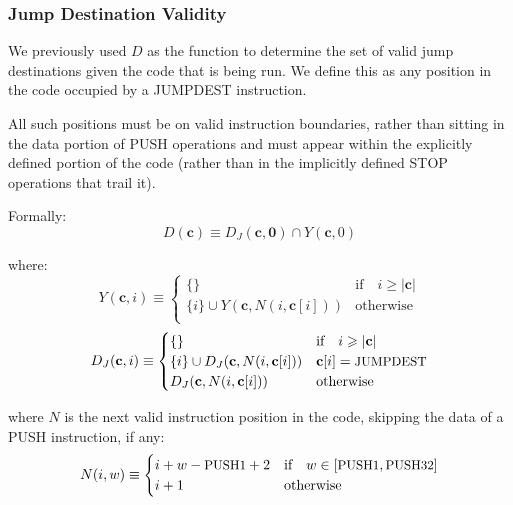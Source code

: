 \documentclass[9pt,oneside]{amsart}
\begin{document}
\begin{multicols}{2}
\subsubsection{Jump Destination Validity}

We previously used $D$ as the function to determine the set of valid jump destinations given the code that is being run. We define this as any position in the code occupied by a {\small JUMPDEST} instruction.

All such positions must be on valid instruction boundaries, rather than sitting in the data portion of {\small PUSH} operations and must appear within the explicitly defined portion of the code (rather than in the implicitly defined {\small STOP} operations that trail it).

Formally:
\begin{equation}
D(\mathbf{c}) \equiv D_J(\mathbf{c, 0}) \cap Y(\mathbf{c}, 0)
\end{equation}

where:
\begin{equation}
Y(\mathbf{c}, i) \equiv \begin{cases}
\{\} & \text{if} \quad i \geqslant |\mathbf{c}| \\
\{ i \} \cup Y(\mathbf{c}, N(i, \mathbf{c}[i])) & \text{otherwise} \\
\end{cases}
\end{equation}
\begin{equation}
D_J(\mathbf{c}, i) \equiv \begin{cases}
\{\} & \text{if} \quad i \geqslant |\mathbf{c}|  \\
\{ i \} \cup D_J(\mathbf{c}, N(i, \mathbf{c}[i])) & \mathbf{c}[i] = \text{\small JUMPDEST} \\
D_J(\mathbf{c}, N(i, \mathbf{c}[i])) & \text{otherwise} \\
\end{cases}
\end{equation}

where $N$ is the next valid instruction position in the code, skipping the data of a {\small PUSH} instruction, if any:
\begin{equation}
N(i, w) \equiv \begin{cases}
i + w - \text{\small PUSH1} + 2 & \text{if} \quad w \in [\text{\small PUSH1}, \text{\small PUSH32}] \\
i + 1 & \text{otherwise} \end{cases}
\end{equation}


\end{multicols}
\end{document}
